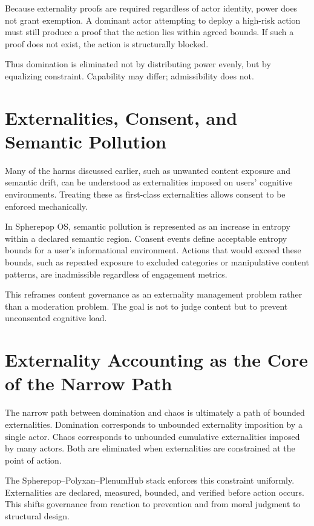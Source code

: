 \documentclass[11pt,oneside]{article}
\begin{document}
Because externality proofs are required regardless of actor identity, power does not grant exemption. A dominant actor attempting to deploy a high-risk action must still produce a proof that the action lies within agreed bounds. If such a proof does not exist, the action is structurally blocked.

Thus domination is eliminated not by distributing power evenly, but by equalizing constraint. Capability may differ; admissibility does not.

\section{Externalities, Consent, and Semantic Pollution}

Many of the harms discussed earlier, such as unwanted content exposure and semantic drift, can be understood as externalities imposed on users’ cognitive environments. Treating these as first-class externalities allows consent to be enforced mechanically.

In Spherepop OS, semantic pollution is represented as an increase in entropy within a declared semantic region. Consent events define acceptable entropy bounds for a user’s informational environment. Actions that would exceed these bounds, such as repeated exposure to excluded categories or manipulative content patterns, are inadmissible regardless of engagement metrics.

This reframes content governance as an externality management problem rather than a moderation problem. The goal is not to judge content but to prevent unconsented cognitive load.

\section{Externality Accounting as the Core of the Narrow Path}

The narrow path between domination and chaos is ultimately a path of bounded externalities. Domination corresponds to unbounded externality imposition by a single actor. Chaos corresponds to unbounded cumulative externalities imposed by many actors. Both are eliminated when externalities are constrained at the point of action.

The Spherepop–Polyxan–PlenumHub stack enforces this constraint uniformly. Externalities are declared, measured, bounded, and verified before action occurs. This shifts governance from reaction to prevention and from moral judgment to structural design.
\end{document}
